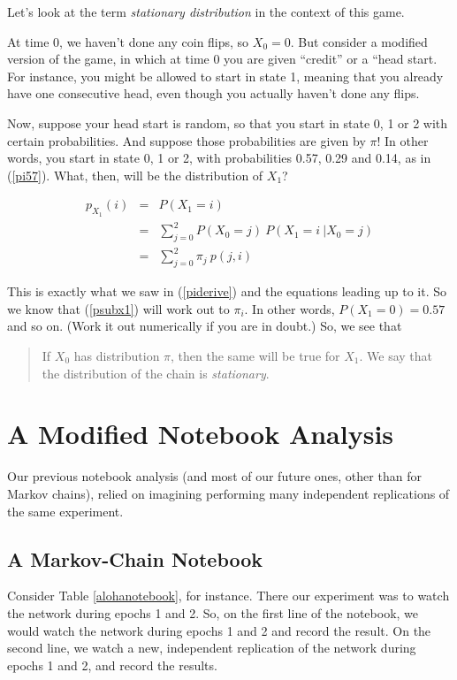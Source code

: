 Let's look at the term {\it stationary distribution} in the context of
this game.

At time 0, we haven't done any coin flips, so $X_0 = 0$.  But consider a
modified version of the game, in which at time 0 you are given
``credit'' or a ``head start.  For instance, you might be allowed to
start in state 1, meaning that you already have one consecutive head,
even though you actually haven't done any flips.

Now, suppose your head start is random, so that you start in state 0, 1
or 2 with certain probabilities.  And suppose those probabilities are
given by $\pi$!  In other words, you start in state 0, 1 or 2, with
probabilities 0.57, 0.29 and 0.14, as in (\ref{pi57}). What, then, will
be the distribution of $X_1$?

\begin{eqnarray}
p_{X_1}(i) &=& P(X_1 = i) \\
&=& \sum_{j=0}^2 P(X_0 = j) ~ P(X_1 = i ~| X_0 = j) \\
&=& \sum_{j=0}^2 \pi_j ~ p(j,i) \label{psubx1}
\end{eqnarray}

This is exactly what we saw in (\ref{piderive}) and the equations
leading up to it.  So we know that (\ref{psubx1}) will work out to
$\pi_i$.  In other words, $P(X_1 = 0) = 0.57$ and so on.
(Work it out numerically if you are in doubt.)  So, we see that

\begin{quote}
If $X_0$ has distribution $\pi$, then the same will be true for $X_1$.
We say that the distribution of the chain is {\it stationary}.
\end{quote}

\section{A Modified Notebook Analysis}
\label{markovnotebook}

Our previous notebook analysis (and most of our future ones, other than
for Markov chains), relied on imagining performing many independent
replications of the same experiment.  

\subsection{A Markov-Chain Notebook}

Consider Table \ref{alohanotebook}, for instance.  There our experiment
was to watch the network during epochs 1 and 2.  So, on the first line
of the notebook, we would watch the network during epochs 1 and 2 and
record the result.  On the second line, we watch a new, independent
replication of the network during epochs 1 and 2, and record the
results.

